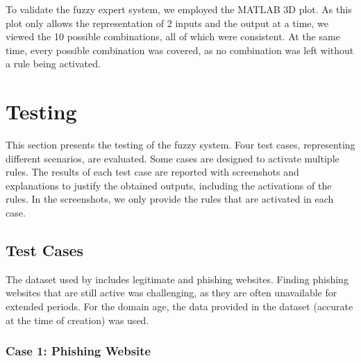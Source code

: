 \documentclass[11pt]{article}
\begin{document}
To validate the fuzzy expert system, we employed the MATLAB 3D plot. As this plot only allows the representation of 2 inputs and the output at a time, we viewed the 10 possible combinations, all of which were consistent. At the same time, every possible combination was covered, as no combination was left without a rule being activated.

\section{Testing}

This section presents the testing of the fuzzy system. Four test cases, representing different scenarios, are evaluated. Some cases are designed to activate multiple rules. The results of each test case are reported with screenshots and explanations to justify the obtained outputs, including the activations of the rules. In the screenshots, we only provide the rules that are activated in each case.

\subsection{Test Cases}

The dataset used by \cite{main_paper} includes legitimate and phishing websites. Finding phishing websites that are still active was challenging, as they are often unavailable for extended periods. For the domain age, the data provided in the dataset (accurate at the time of creation) was used.

\subsubsection{Case 1: Phishing Website}
\end{document}

